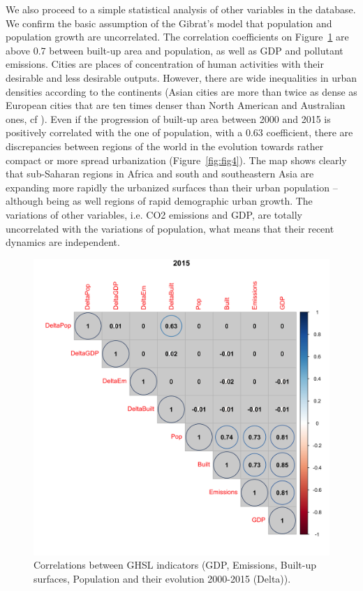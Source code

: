 \documentclass[11pt]{article}
\begin{document}
We also proceed to a simple statistical analysis of other variables in the database. We confirm the basic assumption of the Gibrat's model that population and population growth are uncorrelated. The correlation coefficients on Figure~\ref{fig:fig3} are above 0.7 between built-up area and population, as well as GDP and pollutant emissions. Cities are places of concentration of human activities with their desirable and less desirable outputs. However, there are wide inequalities in urban densities according to the continents (Asian cities are more than twice as dense as European cities that are ten times denser than North American and Australian ones, cf \cite{bertaud2003spatial}). Even if the progression of built-up area between 2000 and 2015 is positively correlated with the one of population, with a 0.63 coefficient, there are discrepancies between regions of the world in the evolution towards rather compact or more spread urbanization (Figure~\ref{fig:fig4}). The map shows clearly that sub-Saharan regions in Africa and south and southeastern Asia are expanding more rapidly the urbanized surfaces than their urban population – although being as well regions of rapid demographic urban growth. The variations of other variables, i.e. CO2 emissions and GDP, are totally uncorrelated with the variations of population, what means that their recent dynamics are independent.

\begin{figure}
\centering
\includegraphics[width=\textwidth]{Fig3.png}
\caption{Correlations between GHSL indicators (GDP, Emissions, Built-up surfaces, Population  and their evolution 2000-2015 (Delta)).\label{fig:fig3}}
\end{figure}   
\end{document}
